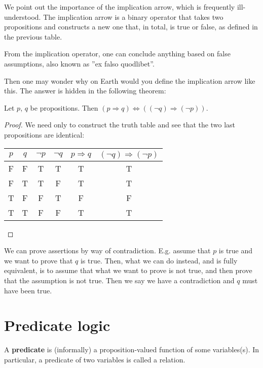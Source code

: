 \documentclass[root.tex]{subfiles}
\begin{document}
We point out the importance of the implication arrow, which is frequently ill-understood. The implication arrow is a binary operator that takes two propositions and constructs a new one that, in total, is true or false, as defined in the previous table.
\begin{remark}
  From the implication operator, one can conclude anything based on false assumptions, also known as ''ex falso quodlibet''.
\end{remark}
Then one may wonder why on Earth would you define the implication arrow like this. The answer is hidden in the following theorem: 
\begin{theorem}
  Let $p$, $q$ be propositions. Then $(p \Rightarrow q) \Leftrightarrow ((\neg q)\Rightarrow (\neg p))$.
\end{theorem}
\newpage
\begin{proof}
  We need only to construct the truth table and see that the two last propositions are identical:
    \begin{table}[h]
      \centering
      \begin{tabular}{c|c||c|c|c|c}
        $p$ & $q$ & $\neg p$ & $ \neg q$ & $p \Rightarrow q$ & $(\neg q) \Rightarrow (\neg p)$ \\
        \hline
          \rule{0pt}{12pt} F & F & T & T & T & T\\
                           F & T & T & F & T & T\\
                           T & F & F & T & F & F\\
                           T & T & F & F & T & T
      \end{tabular}
    \end{table}

\end{proof}

\begin{corollary}
  We can prove assertions by way of contradiction. E.g. assume that $p$ is true and we want to prove that $q$ is true. Then, what we can do instead, and is fully equivalent, is to assume that what we want to prove is not true, and then prove that the assumption is not true. Then we say we have a contradiction and $q$ must have been true.
\end{corollary}


\section{Predicate logic}
\begin{mydef}
  A \textbf{predicate} is (informally) a proposition-valued function of some variables(s). In particular, a predicate of two variables is called a relation.
\end{mydef}
\end{document}

